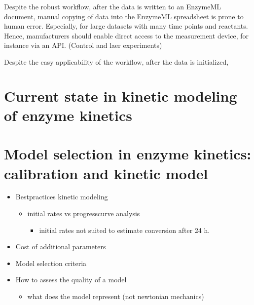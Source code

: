 \documentclass[letterpaper,10pt,english]{jupyterBook}
\begin{document}
\sphinxAtStartPar
Despite the robust workflow, after the data is written to an EnzymeML document, manual copying of data into the EnzymeML spreadsheet is prone to human error. Especially, for large datasets with many time points and reactants. Hence, manufacturers should enable direct access to the measurement device, for instance via an API. (Control and laer experiments)

\sphinxAtStartPar
Despite the easy applicability of the workflow, after the data is initialized,


\section{Current state in kinetic modeling of enzyme kinetics}
\label{\detokenize{discussion:current-state-in-kinetic-modeling-of-enzyme-kinetics}}

\section{Model selection in enzyme kinetics: calibration and kinetic model}
\label{\detokenize{discussion:model-selection-in-enzyme-kinetics-calibration-and-kinetic-model}}\begin{itemize}
\item {} 
\sphinxAtStartPar
Best\sphinxhyphen{}practices kinetic modeling
\begin{itemize}
\item {} 
\sphinxAtStartPar
initial rates vs progress\sphinxhyphen{}curve analysis
\begin{itemize}
\item {} 
\sphinxAtStartPar
initial rates not suited to estimate conversion after 24 h.

\end{itemize}

\end{itemize}

\item {} 
\sphinxAtStartPar
Cost of additional parameters

\item {} 
\sphinxAtStartPar
Model selection criteria

\item {} 
\sphinxAtStartPar
How to assess the quality of a model
\begin{itemize}
\item {} 
\sphinxAtStartPar
what does the model represent (not newtonian mechanics)

\end{itemize}

\end{itemize}
\end{document}
